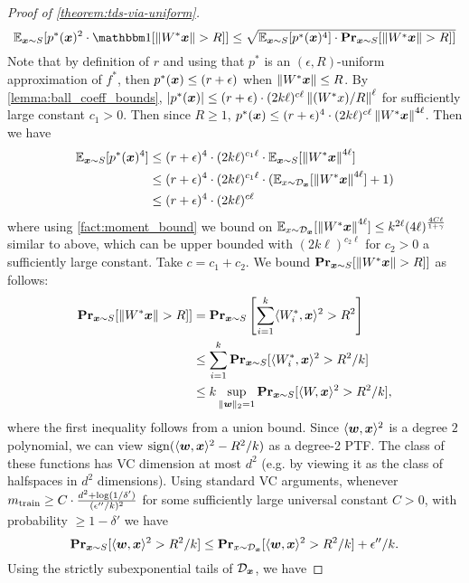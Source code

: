 \documentclass[11pt]{article} %
\numberwithin{equation}{section}
\begin{document}
\begin{proof}[Proof of \cref{theorem:tds-via-uniform}]
    \[
    \E_{\x \sim S}[p^*(\x)^2 \cdot \ind[\Norm{W^*\x} >R]] \le \sqrt{\E_{\x \sim S}[p^*(\x)^4]\cdot \Pr_{\x \sim S}[\Norm{W^*\x} >R]]}
    \]
    Note that by definition of $r$ and using that $p^*$ is an $(\epsilon, R)$-uniform approximation of $f^*$, then $p^*({\bm{x}}) \le (r + \epsilon)$ when $\left\| W^*{\bm{x}} \right\| \le R$. By \cref{lemma:ball_coeff_bounds}, $|p^*({\bm{x}})| \le (r + \epsilon) \cdot (2k\ell)^{c\ell}\left\| (W^*x)/R \right\|^\ell$ for sufficiently large constant $c_1 > 0$. Then since $R \ge 1$, $p^*({\bm{x}}) \le (r + \epsilon)^4 \cdot (2k\ell)^{c\ell} \left\| W^*{\bm{x}} \right\|^{4\ell}$. Then we have
    \begin{align*}
        \mathbb{E}_{{\bm{x}} \sim S}[p^*({\bm{x}})^4] &\le (r + \epsilon)^4 \cdot (2k\ell)^{c_1\ell} \cdot \mathbb{E}_{{\bm{x}} \sim S}[\left\| W^*{\bm{x}} \right\|^{4\ell}] \\
        &\le (r + \epsilon)^4 \cdot (2k\ell)^{c_1\ell} \cdot (\mathbb{E}_{x \sim {\mathcal{D}}_{{\bm{x}}}}[\left\| W^*{\bm{x}} \right\|^{4\ell}] + 1) \\
        &\le (r + \epsilon)^4 \cdot (2k \ell)^{c\ell}
    \end{align*}
    where using \cref{fact:moment_bound} we bound on $\mathbb{E}_{x \sim {\mathcal{D}}_{{\bm{x}}}}[\left\| W^*{\bm{x}} \right\|^{4\ell}] \le k^{2\ell}(4\ell)^{\frac{4C\ell}{1+\gamma}}$ similar to above, which can be upper bounded with $(2k\ell)^{c_2\ell}$ for $c_2 > 0$ a sufficiently large constant. Take $c = c_1 + c_2$.
    We bound $\mathbf{Pr}_{{\bm{x}} \sim S}[\left\| W^*{\bm{x}} \right\| >R]]$ as follows:
    \begin{align*}
        \mathbf{Pr}_{{\bm{x}} \sim S}[\left\| W^*{\bm{x}} \right\| >R]] &= \mathbf{Pr}_{{\bm{x}} \sim S}\left[ \sum_{i=1}^k \langle W_i^*, {\bm{x}}\rangle^2 > R^2 \right] \\
        &\le \sum_{i=1}^k \mathbf{Pr}_{{\bm{x}} \sim S}[\langle W_i^*, {\bm{x}}\rangle^2 > R^2/k] \\
        &\le k \sup_{\|{\bm{w}}\|_{2} = 1} \mathbf{Pr}_{{\bm{x}} \sim S}[\langle W, {\bm{x}}\rangle^2 > R^2/k],
    \end{align*}
    where the first inequality follows from a union bound.
    Since $\langle {\bm{w}}, {\bm{x}}\rangle^2$ is a degree $2$ polynomial, we can view $\operatorname{sign}(\langle {\bm{w}}, {\bm{x}}\rangle^2 - R^2/k)$ as a degree-2 PTF. The class of these functions has VC dimension at most $d^2$ (e.g. by viewing it as the class of halfspaces in $d^2$ dimensions). Using standard VC arguments, whenever $m_{\mathrm{train}} \ge C \cdot \frac{d^2 + \log(1/\delta')}{(\epsilon'' / k)^2}$ for some sufficiently large universal constant $C > 0$, with probability $\ge 1 - \delta'$ we have
    \[
    \mathbf{Pr}_{{\bm{x}} \sim S}[\langle {\bm{w}}, {\bm{x}}\rangle^2 > R^2/k] \le \mathbf{Pr}_{x \sim {\mathcal{D}}_{{\bm{x}}}}[\langle {\bm{w}}, {\bm{x}}\rangle^2 > R^2/k] + \epsilon''/k.
    \]
    Using the strictly subexponential tails of ${\mathcal{D}}_{{\bm{x}}}$, we have

\end{proof}
\end{document}

